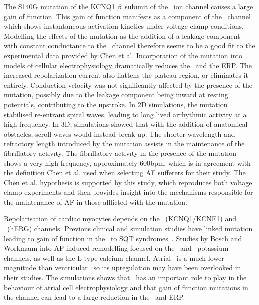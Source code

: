 The S140G mutation of the KCNQ1 $\beta$\ subunit of the \ ion channel
causes a large gain of function.
This gain of function manifests as a component of the \ channel which
shows instantaneous activation kinetics under voltage clamp conditions.
Modelling the effects of the mutation as the addition of a leakage component
with constant conductance to the \ channel therefore seems to be a good
fit to the experimental data provided by Chen et al.
Incorporation of the mutation into models of cellular electrophysiology
dramatically reduces the \apd\ and the ERP.
The increased repolarization current also flattens the plateau region, or
eliminates it entirely.
Conduction velocity was not significantly affected by the presence of the
mutation, possibly due to the leakage component being inward at resting
potentials, contributing to the upstroke.
In 2D simulations, the mutation stabilised re-entrant spiral waves, leading to
long lived arrhythmic activity at a high frequency.
In 3D, simulations showed that with the addition of anatomical obstacles,
scroll-waves would instead break up.
The shorter wavelength and refractory length introduced by the mutation assists
in the maintenance of the fibrillatory activity.
The fibrillatory activity in the presence of the mutation shows a very high
frequency, approximately \unit{600}{bpm}, which is in agreement with the
definition Chen et al. used when selecting AF sufferers for their study.
The Chen et al. hypothesis is supported by this study, which reproduces both
voltage clamp experiments and then provides insight into the mechanisms
responsible for the maintenance of AF in those afflicted with the mutation.

Repolarisation of cardiac myocytes depends on the \ (KCNQ1/KCNE1) and
\ (hERG) channels.
Previous clinical and simulation studies have linked mutation leading to
gain of function in the \ to SQT syndromes~\cite{Brugada2004,Hong2005}.
Studies by Bosch and Workmann into AF induced remodelling focused on the
\ and \ potassium channels, as well as the L-type calcium channel.
Atrial \ is a much lower magnitude than ventricular \ so its
upregulation may have been overlooked in their studies.
The simulations shows that \ has an important role to play in the behaviour
of atrial cell electrophysiology and that gain of function mutations in the
channel can lead to a large reduction in the \apd\ and ERP.

